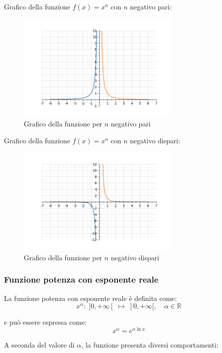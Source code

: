 \documentclass[oneside,10pt]{book} %
\begin{document}
Grafico della funzione $f(x) = x^n$ con $n$ negativo pari:
\begin{figure}[H]
    \centering
    \includegraphics[width=0.7\textwidth]{./img/esponente_neg_pari.png}
    \caption{Grafico della funzione per $n$ negativo pari}
    \label{fig:esponente_neg_pari}
\end{figure}
\FloatBarrier

Grafico della funzione $f(x) = x^n$ con $n$ negativo dispari:
\begin{figure}[H]
    \centering
    \includegraphics[width=0.7\textwidth]{./img/esponente_neg_dispari.png}
    \caption{Grafico della funzione per $n$ negativo dispari}
    \label{fig:esponente_neg_dispari}
\end{figure}
\FloatBarrier

\subsubsection{Funzione potenza con esponente reale}

La funzione potenza con esponente reale è definita come:
\[
x^\alpha : \; ]0, +\infty[ \; \longmapsto \; ]0, +\infty[, \quad \alpha \in \mathbb{R}
\]

e può essere espressa come:
\[
x^\alpha = e^{\alpha \ln x}
\]

A seconda del valore di $\alpha$, la funzione presenta diversi comportamenti:
\end{document}
